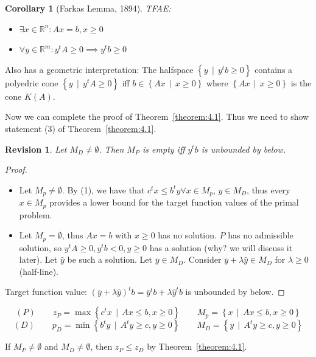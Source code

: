 \documentclass[a4paper]{article}
\newcounter{lecref}[subsection]
\numberwithin{lecref}{subsection}
\newtheorem{corollary}[lecref]{Corollary}
\newtheorem{revision}{Revision}
\newcommand{\SetDef}[2]{\left\{#1\,\mid\,#2\right\}}
\begin{document}
\begin{corollary}[Farkas Lemma, 1894]
	\label{corollary:4.4}
	TFAE:
	\begin{itemize}
		\item $\exists x \in \mathbb R^n: Ax = b, x \geq 0$
		\item $\forall y \in \mathbb R^m: y^t A \geq 0 \implies y^t b \geq 0$
	\end{itemize}
\end{corollary}

Also has a geometric interpretation:
The halfspace $\SetDef{y}{y^t b \geq 0}$ contains a polyedric cone $\SetDef{y}{y^t A \geq 0}$ %
iff $b \in \SetDef{Ax}{x \geq 0}$ where $\SetDef{Ax}{x \geq 0}$ is the cone $K(A)$.

Now we can complete the proof of Theorem~\ref{theorem:4.1}.
Thus we need to show statement (3) of Theorem~\ref{theorem:4.1}.

\begin{revision}
	Let $M_D \neq \emptyset$. Then $M_P$ is empty iff $y^t b$ is unbounded by below.
\end{revision}

\begin{proof}
	\begin{itemize}
		\item
			Let $M_p \neq \emptyset$. By (1), we have that $c^t x \leq b^t y \forall x \in M_p$, $y \in M_D$,
			thus every $x \in M_p$ provides a lower bound for the target function values of the primal problem.
		\item
			Let $M_p = \emptyset$, thus $Ax = b$ with $x \geq 0$ has no solution.
			$P$ has no admissible solution, so $y^t A \geq 0, y^t b < 0, y \geq 0$ has a solution (why? we will discuss it later).
			Let $\hat y$ be such a solution. Let $\overline y \in M_D$. Consider $\overline y + \lambda \hat y \in M_D$ for $\lambda \geq 0$ (half-line).
	\end{itemize}

	Target function value: $(\overline y + \lambda \hat y)^t b = \overline y^t b + \lambda \hat y^t b$ is unbounded by below.
\end{proof}

\[ (P) \qquad z_P = \max\SetDef{c^t x}{Ax \leq b, x \geq 0} \qquad M_p = \SetDef{x}{Ax \leq b, x \geq 0}  \]
\[ (D) \qquad p_D = \min\SetDef{b^t y}{A^t y \geq c, y \geq 0} \qquad M_D = \SetDef{y}{A^t y \geq c, y \geq 0} \]

If $M_P \neq \emptyset$ and $M_D \neq \emptyset$, then $z_P \leq z_D$ by Theorem~\ref{theorem:4.1}.
\end{document}
